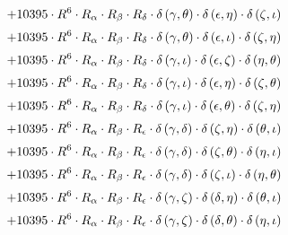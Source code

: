\begin{subequations}
\begin{gather}
 \\[0.2em] \notag 		 + 10395 \cdot R^{6} \cdot R_{\alpha{}} \cdot R_{\beta{}} \cdot R_{\delta{}} \cdot \delta{}\left(\gamma{}, \theta{}\right) \cdot \delta{}\left(\epsilon{}, \eta{}\right) \cdot \delta{}\left(\zeta{}, \iota{}\right) 
 \\[0.2em] \notag 		 + 10395 \cdot R^{6} \cdot R_{\alpha{}} \cdot R_{\beta{}} \cdot R_{\delta{}} \cdot \delta{}\left(\gamma{}, \theta{}\right) \cdot \delta{}\left(\epsilon{}, \iota{}\right) \cdot \delta{}\left(\zeta{}, \eta{}\right) 
 \\[0.2em] \notag 		 + 10395 \cdot R^{6} \cdot R_{\alpha{}} \cdot R_{\beta{}} \cdot R_{\delta{}} \cdot \delta{}\left(\gamma{}, \iota{}\right) \cdot \delta{}\left(\epsilon{}, \zeta{}\right) \cdot \delta{}\left(\eta{}, \theta{}\right) 
 \\[0.2em] \notag 		 + 10395 \cdot R^{6} \cdot R_{\alpha{}} \cdot R_{\beta{}} \cdot R_{\delta{}} \cdot \delta{}\left(\gamma{}, \iota{}\right) \cdot \delta{}\left(\epsilon{}, \eta{}\right) \cdot \delta{}\left(\zeta{}, \theta{}\right) 
 \\[0.2em] \notag 		 + 10395 \cdot R^{6} \cdot R_{\alpha{}} \cdot R_{\beta{}} \cdot R_{\delta{}} \cdot \delta{}\left(\gamma{}, \iota{}\right) \cdot \delta{}\left(\epsilon{}, \theta{}\right) \cdot \delta{}\left(\zeta{}, \eta{}\right) 
 \\[0.2em] \notag 		 + 10395 \cdot R^{6} \cdot R_{\alpha{}} \cdot R_{\beta{}} \cdot R_{\epsilon{}} \cdot \delta{}\left(\gamma{}, \delta{}\right) \cdot \delta{}\left(\zeta{}, \eta{}\right) \cdot \delta{}\left(\theta{}, \iota{}\right) 
 \\[0.2em] \notag 		 + 10395 \cdot R^{6} \cdot R_{\alpha{}} \cdot R_{\beta{}} \cdot R_{\epsilon{}} \cdot \delta{}\left(\gamma{}, \delta{}\right) \cdot \delta{}\left(\zeta{}, \theta{}\right) \cdot \delta{}\left(\eta{}, \iota{}\right) 
 \\[0.2em] \notag 		 + 10395 \cdot R^{6} \cdot R_{\alpha{}} \cdot R_{\beta{}} \cdot R_{\epsilon{}} \cdot \delta{}\left(\gamma{}, \delta{}\right) \cdot \delta{}\left(\zeta{}, \iota{}\right) \cdot \delta{}\left(\eta{}, \theta{}\right) 
 \\[0.2em] \notag 		 + 10395 \cdot R^{6} \cdot R_{\alpha{}} \cdot R_{\beta{}} \cdot R_{\epsilon{}} \cdot \delta{}\left(\gamma{}, \zeta{}\right) \cdot \delta{}\left(\delta{}, \eta{}\right) \cdot \delta{}\left(\theta{}, \iota{}\right) 
 \\[0.2em] \notag 		 + 10395 \cdot R^{6} \cdot R_{\alpha{}} \cdot R_{\beta{}} \cdot R_{\epsilon{}} \cdot \delta{}\left(\gamma{}, \zeta{}\right) \cdot \delta{}\left(\delta{}, \theta{}\right) \cdot \delta{}\left(\eta{}, \iota{}\right) 

\end{gather}
\end{subequations}
